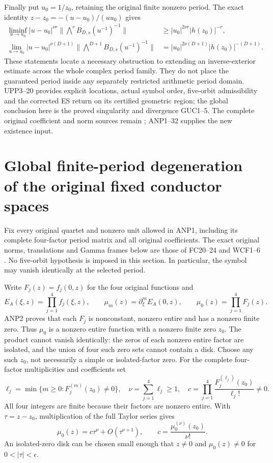 \documentclass[11pt]{article}
\begin{document}
Finally put $u_0=1/z_0$, retaining the original finite nonzero period.
The exact identity
$z-z_0=-(u-u_0)/(uu_0)$ gives
\[
 \begin{split}
 \liminf_{u\to u_0}|u-u_0|^{\nu r}
       \|\bigwedge^r B_{D,s}(u^{-1})^{-1}\|
       &\ge |u_0|^{2\nu r}|h(z_0)|^{-r},\\
 \lim_{u\to u_0}|u-u_0|^{\nu(D+1)}
       \|\bigwedge^{D+1}B_{D,s}(u^{-1})^{-1}\|
       &=|u_0|^{2\nu(D+1)}|h(z_0)|^{-(D+1)}.
 \end{split}\tag{GUC5}
\]
These statements locate a necessary obstruction to extending an
inverse-exterior estimate across the whole complex period family.
They do not place the guaranteed period inside any separately
restricted arithmetic period domain. UPP3--20 provides explicit
locations, actual symbol order, five-orbit admissibility and the
corrected ES return on its certified geometric region; the global
conclusion here is the proved singularity and divergence GUC1--5.
The complete original coefficient and norm sources remain
\cite{PCLOriginal,WCF}; ANP1--32 supplies the new existence input.

\section{Global finite-period degeneration of the original fixed conductor spaces}
Fix every original quartet and nonzero unit allowed in ANP1, including
its complete four-factor period matrix and all original coefficients.
The exact original norms, translations and Gamma frames below are those
of FC20--24 and WCF1--6 \cite{WCF,Cumulative,PCLOriginal}.
No five-orbit hypothesis is imposed in this section. In particular,
the symbol may vanish identically at the selected period.

Write $F_j(z)=f_j(0,z)$ for the four original functions and
\[
 E_A(\xi,z)=\prod_{j=1}^4 f_j(\xi,z),\qquad
 \mu_m(z)=\partial_\xi^mE_A(0,z),\qquad
 \mu_0(z)=\prod_{j=1}^4F_j(z).
 \tag{GFC1}
\]
ANP2 proves that each $F_j$ is nonconstant, nonzero entire and has a
nonzero finite zero. Thus $\mu_0$ is a nonzero entire function with a
nonzero finite zero $z_0$. The product cannot vanish identically:
the zeros of each nonzero entire factor are isolated, and the union
of four such zero sets cannot contain a disk.
Choose any such $z_0$, not necessarily a simple or isolated-factor zero.
For the complete four-factor multiplicities and coefficients set
\[
 \ell_j=\min\{m\ge0:F_j^{(m)}(z_0)\ne0\},\quad
 \nu=\sum_{j=1}^4\ell_j\ge1,\quad
 c=\prod_{j=1}^4\frac{F_j^{(\ell_j)}(z_0)}{\ell_j!}\ne0.
 \tag{GFC2}
\]
All four integers are finite because their factors are nonzero entire.
With $\tau=z-z_0$, multiplication of the full Taylor series gives
\[
 \mu_0(z)=c\tau^\nu+O(\tau^{\nu+1}),\qquad
 c=\frac{\mu_0^{(\nu)}(z_0)}{\nu!}.
 \tag{GFC3}
\]
An isolated-zero disk can be chosen small enough that $z\ne0$ and
$\mu_0(z)\ne0$ for $0<|\tau|<\epsilon$.
\end{document}

